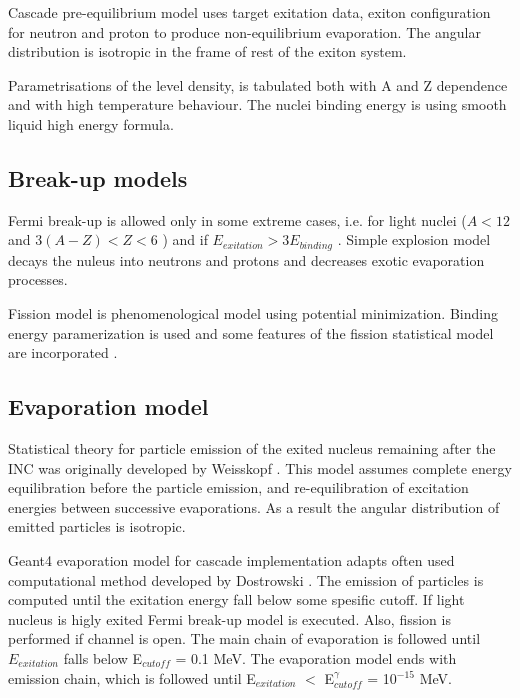 \documentclass[twocolumn,twoside,slac]{revtex4}
\begin{document}
Cascade pre-equilibrium model uses target exitation data, 
exiton configuration for neutron and proton to produce non-equilibrium evaporation.
The angular distribution is isotropic in the frame of rest of the exiton system.

Parametrisations of the level density, is tabulated both with A and Z dependence and with high temperature 
behaviour. The nuclei binding energy is using smooth liquid high energy formula.


\subsection{Break-up models}


Fermi break-up is allowed only in some extreme cases, i.e. for light nuclei ($A < 12$ and  $3 (A - Z) < Z < 6$ ) and 
if $E_{exitation} > 3 E_{binding}$ .
Simple explosion model decays the nuleus into neutrons and protons and decreases exotic evaporation processes.

Fission model is phenomenological model using potential minimization. 
Binding energy paramerization is used and some features of the fission statistical model are incorporated \cite{fong69}.


\subsection{Evaporation model}

Statistical theory for particle emission of the exited nucleus remaining after the INC was originally developed by Weisskopf \cite{weisskopf37}. 
This model assumes complete energy equilibration before the particle emission, and re-equilibration of excitation energies between successive evaporations. 
As a result the angular distribution of emitted particles is isotropic.

Geant4 evaporation model for cascade implementation adapts often used computational method developed by Dostrowski \cite{dostrovsky59, dostrovsky60}.
The emission of particles is computed until the exitation energy fall below some spesific cutoff. 
If light nucleus is higly exited Fermi break-up model is executed. Also, fission is performed if channel is open. 
The main chain of evaporation is followed until  $E_{exitation}$ falls below E$_{cutoff}$ = 0.1 MeV. 
The evaporation model ends with  emission chain, which is followed until E$_{exitation}$ $<$ E$^{\gamma}_{cutoff}$ = 10$^{-15}$ MeV.
\end{document}
